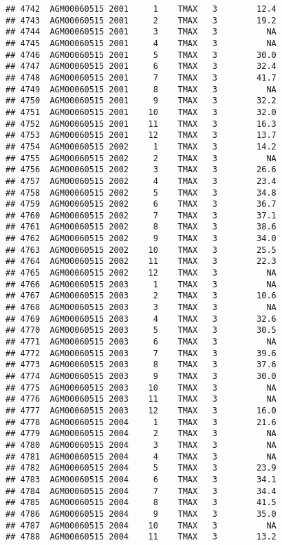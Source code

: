 \documentclass{article}\usepackage[]{graphicx}\usepackage[]{color}
\makeatletter
\newenvironment{kframe}{%
 \def\at@end@of@kframe{}%
 \ifinner\ifhmode%
  \def\at@end@of@kframe{\end{minipage}}%
  \begin{minipage}{\columnwidth}%
 \fi\fi%
 \def\FrameCommand##1{\hskip\@totalleftmargin \hskip-\fboxsep
 \colorbox{shadecolor}{##1}\hskip-\fboxsep
     \hskip-\linewidth \hskip-\@totalleftmargin \hskip\columnwidth}%
 \MakeFramed {\advance\hsize-\width
   \@totalleftmargin\z@ \linewidth\hsize
   \@setminipage}}%
 {\par\unskip\endMakeFramed%
 \at@end@of@kframe}
\newenvironment{knitrout}{}{} %
\makeatother
\begin{document}
\begin{knitrout}
\begin{kframe}
\begin{verbatim}
## 4742  AGM00060515 2001     1    TMAX   3        12.4
## 4743  AGM00060515 2001     2    TMAX   3        19.2
## 4744  AGM00060515 2001     3    TMAX   3          NA
## 4745  AGM00060515 2001     4    TMAX   3          NA
## 4746  AGM00060515 2001     5    TMAX   3        30.0
## 4747  AGM00060515 2001     6    TMAX   3        32.4
## 4748  AGM00060515 2001     7    TMAX   3        41.7
## 4749  AGM00060515 2001     8    TMAX   3          NA
## 4750  AGM00060515 2001     9    TMAX   3        32.2
## 4751  AGM00060515 2001    10    TMAX   3        32.0
## 4752  AGM00060515 2001    11    TMAX   3        16.3
## 4753  AGM00060515 2001    12    TMAX   3        13.7
## 4754  AGM00060515 2002     1    TMAX   3        14.2
## 4755  AGM00060515 2002     2    TMAX   3          NA
## 4756  AGM00060515 2002     3    TMAX   3        26.6
## 4757  AGM00060515 2002     4    TMAX   3        23.4
## 4758  AGM00060515 2002     5    TMAX   3        34.8
## 4759  AGM00060515 2002     6    TMAX   3        36.7
## 4760  AGM00060515 2002     7    TMAX   3        37.1
## 4761  AGM00060515 2002     8    TMAX   3        38.6
## 4762  AGM00060515 2002     9    TMAX   3        34.0
## 4763  AGM00060515 2002    10    TMAX   3        25.5
## 4764  AGM00060515 2002    11    TMAX   3        22.3
## 4765  AGM00060515 2002    12    TMAX   3          NA
## 4766  AGM00060515 2003     1    TMAX   3          NA
## 4767  AGM00060515 2003     2    TMAX   3        10.6
## 4768  AGM00060515 2003     3    TMAX   3          NA
## 4769  AGM00060515 2003     4    TMAX   3        32.6
## 4770  AGM00060515 2003     5    TMAX   3        30.5
## 4771  AGM00060515 2003     6    TMAX   3          NA
## 4772  AGM00060515 2003     7    TMAX   3        39.6
## 4773  AGM00060515 2003     8    TMAX   3        37.6
## 4774  AGM00060515 2003     9    TMAX   3        30.0
## 4775  AGM00060515 2003    10    TMAX   3          NA
## 4776  AGM00060515 2003    11    TMAX   3          NA
## 4777  AGM00060515 2003    12    TMAX   3        16.0
## 4778  AGM00060515 2004     1    TMAX   3        21.6
## 4779  AGM00060515 2004     2    TMAX   3          NA
## 4780  AGM00060515 2004     3    TMAX   3          NA
## 4781  AGM00060515 2004     4    TMAX   3          NA
## 4782  AGM00060515 2004     5    TMAX   3        23.9
## 4783  AGM00060515 2004     6    TMAX   3        34.1
## 4784  AGM00060515 2004     7    TMAX   3        34.4
## 4785  AGM00060515 2004     8    TMAX   3        41.5
## 4786  AGM00060515 2004     9    TMAX   3        35.0
## 4787  AGM00060515 2004    10    TMAX   3          NA
## 4788  AGM00060515 2004    11    TMAX   3        13.2

\end{verbatim}
\end{kframe}
\end{knitrout}
\end{document}
